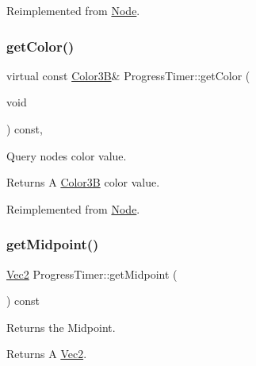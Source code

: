 Reimplemented from \hyperlink{classNode_a06721d272f5a59e02e355d95be25bb99}{Node}.

\mbox{\label{classProgressTimer_ad8ca5deb560d078fcd576c896981b5c2}} 
\subsubsection{\texorpdfstring{get\+Color()}{getColor()}\hspace{0.1cm}{\footnotesize\ttfamily [2/2]}}
{\footnotesize\ttfamily virtual const \hyperlink{structColor3B}{Color3B}\& Progress\+Timer\+::get\+Color (\begin{DoxyParamCaption}\item[{void}]{ }\end{DoxyParamCaption}) const\hspace{0.3cm}{\ttfamily [override]}, {\ttfamily [virtual]}}

Query node\textquotesingle{}s color value. \begin{DoxyReturn}{Returns}
A \hyperlink{structColor3B}{Color3B} color value. 
\end{DoxyReturn}


Reimplemented from \hyperlink{classNode_a06721d272f5a59e02e355d95be25bb99}{Node}.

\mbox{\label{classProgressTimer_a3b680cbc620a22d766aea62b518ef66f}} 
\subsubsection{\texorpdfstring{get\+Midpoint()}{getMidpoint()}\hspace{0.1cm}{\footnotesize\ttfamily [1/2]}}
{\footnotesize\ttfamily \hyperlink{classVec2}{Vec2} Progress\+Timer\+::get\+Midpoint (\begin{DoxyParamCaption}{ }\end{DoxyParamCaption}) const}

Returns the Midpoint.

\begin{DoxyReturn}{Returns}
A \hyperlink{classVec2}{Vec2}. 
\end{DoxyReturn}
\mbox{\label{classProgressTimer_a3b680cbc620a22d766aea62b518ef66f}} 
